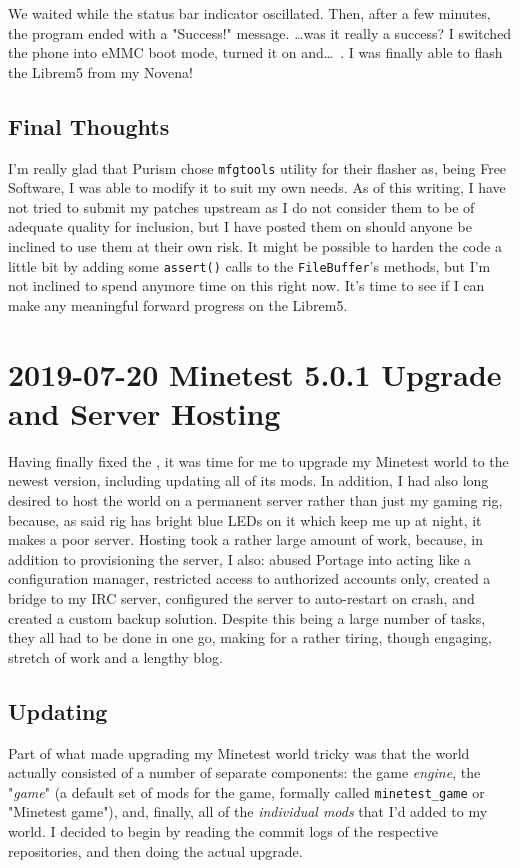 \documentclass{article}
\begin{document}
We waited while the status bar indicator oscillated.  Then, after a few minutes, the program ended with a "Success!" message.  \ldots was it really a success?  I switched the phone into eMMC boot mode, turned it on and\ldots~.  I was finally able to flash the Librem5 from my Novena!

\subsection{Final Thoughts}
I'm really glad that Purism chose \texttt{mfgtools} utility for their flasher as, being Free Software, I was able to modify it to suit my own needs.  As of this writing, I have not tried to submit my patches upstream as I do not consider them to be of adequate quality for inclusion, but I have posted them on  should anyone be inclined to use them at their own risk.  It might be possible to harden the code a little bit by adding some \texttt{assert()} calls to the \texttt{FileBuffer}'s methods, but I'm not inclined to spend anymore time on this right now.  It's time to see if I can make any meaningful forward progress on the Librem5.


\section{2019-07-20 Minetest 5.0.1 Upgrade and Server Hosting}
Having finally fixed the , it was time for me to upgrade my Minetest world to the newest version, including updating all of its mods.  In addition, I had also long desired to host the world on a permanent server rather than just my gaming rig, because, as said rig has bright blue LEDs on it which keep me up at night, it makes a poor server.  Hosting took a rather large amount of work, because, in addition to provisioning the server, I also: abused Portage into acting like a configuration manager, restricted access to authorized accounts only, created a bridge to my IRC server, configured the server to auto-restart on crash, and created a custom backup solution.  Despite this being a large number of tasks, they all had to be done in one go, making for a rather tiring, though engaging, stretch of work and a lengthy blog.

\subsection{Updating}
Part of what made upgrading my Minetest world tricky was that the world actually consisted of a number of separate components: the game \emph{engine}, the "\emph{game}" (a default set of mods for the game, formally called \texttt{minetest_game} or "Minetest game"), and, finally, all of the \emph{individual mods} that I'd added to my world.  I decided to begin by reading the commit logs of the respective repositories, and then doing the actual upgrade.
\end{document}
